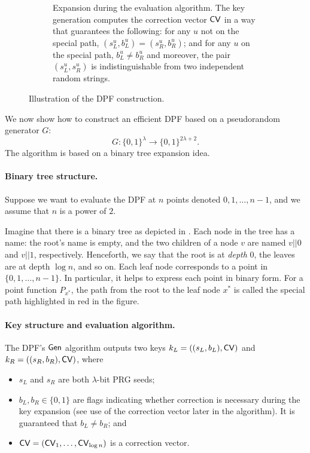 \begin{figure}[t]
\begin{subfigure}{0.48\textwidth}
        \caption{Expansion during the evaluation algorithm.
The key generation computes the correction vector ${\sf CV}$ 
in a way that guarantees the following: 
for any $u$ not on the special
path, $(s_L^u, b_L^u) = (s_R^u, b_R^u)$;
and for any $u$ on the special path, 
$b_L^u \neq b_R^u$ and moreover,
the pair $(s_L^u, s_R^u)$ is indistinguishable
from two independent random strings.
}
\label{fig:expand}
    \end{subfigure}
     \caption{Illustration of the DPF construction.\label{fig:dpf-demo}}
\end{figure}





We now show how to construct an efficient DPF based on a pseudorandom
generator $G$:
 $$G: \{0,1\}^{\lambda} \rightarrow  \{0,1\}^{2\lambda + 2}. $$
The algorithm is based on a binary tree expansion idea.

\paragraph{Binary tree structure.}
Suppose we want to evaluate the DPF
at $n$ points denoted $0, 1, \ldots,  n-1$,
and we assume that $n$ is a power of $2$.

Imagine that there is a binary tree
as depicted in .
Each node in the tree has a name:  
the root's name is empty, and the two children of a node $v$ 
are named $v||0$ and $v||1$, respectively.
Henceforth, we say that the root is at {\it depth} $0$, the leaves
are at depth $\log n$, and so on.
Each leaf node corresponds to a point in 
$\{0, 1, \ldots, n-1\}$. In particular, it helps to express
each point in binary form.
For a point function $P_{x^*}$, 
the path from the root to the leaf node $x^*$ 
is called the special path highlighted in {\color{red}red}
in the figure. 

\paragraph{Key structure and evaluation algorithm.}
The DPF's ${\sf Gen}$ algorithm outputs two keys
$k_L = ((s_L, b_L), {{\sf CV}})$ and $k_R = ((s_R, b_R), {{\sf CV}})$,
where 
\begin{itemize}[leftmargin=7mm]
\item $s_L$ and $s_R$ are both $\lambda$-bit PRG seeds;
\item 
$b_L, b_R\in \{0, 1\}$ are flags indicating whether 
correction is necessary during the key expansion (see use
of the correction vector later in the algorithm). It
is guaranteed that $b_L \neq b_R$; 
and 
\item 
${\sf CV} = ({\sf CV}_1, \ldots, {\sf CV}_{\log n})$ 
is a correction vector.
\end{itemize}

